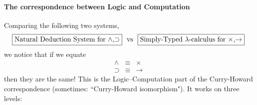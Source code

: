 \documentclass{svmult}
\begin{document}
\paragraph{The correspondence between Logic and Computation} Comparing the following two systems,
\[
  \fbox{Natural Deduction System for $\wedge$,$\supset$}\text{ \ vs \ }
  \fbox{Simply-Typed $\lambda$-calculus for $\times$,$\rightarrow$}
\]
we notice that if we equate
\[ \begin{array}{lcl}
\wedge & \equiv & \times \\
\supset & \equiv & \rightarrow
\end{array} \]
then they are the same! This is the Logic--Computation part of the Curry-Howard correspondence (sometimes: ``Curry-Howard isomorphism"). It works on three levels:
\begin{center}
\end{center}
%
%
\end{document}
